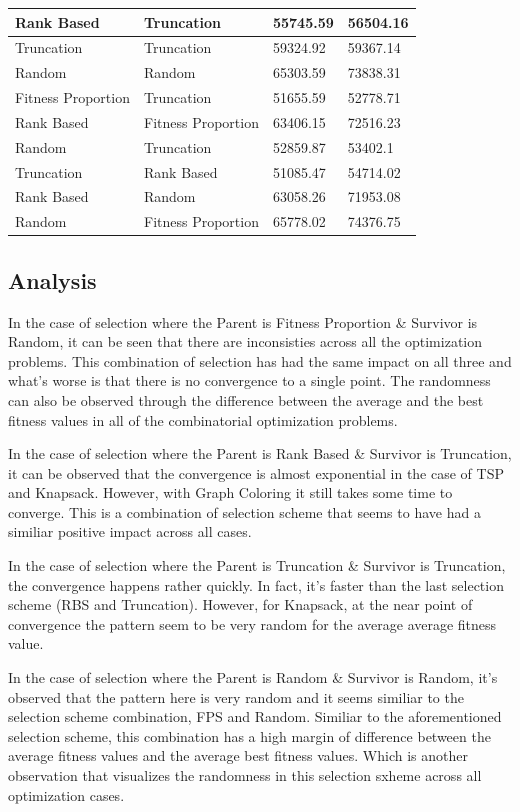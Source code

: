 \documentclass[11pt, letterpaper]{article}
\begin{document}
\begin{table}[H]
\begin{tabular}{|l|l|l|l|}
        Rank Based & Truncation & 55745.59 & 56504.16 \\ \hline
        Truncation & Truncation & 59324.92 & 59367.14 \\ \hline
        Random & Random & 65303.59 & 73838.31 \\ \hline
        Fitness Proportion & Truncation & 51655.59 & 52778.71 \\ \hline
        Rank Based & Fitness Proportion & 63406.15 & 72516.23 \\ \hline
        Random & Truncation & 52859.87 & 53402.1 \\ \hline
        Truncation & Rank Based & 51085.47 & 54714.02 \\ \hline
        Rank Based & Random & 63058.26 & 71953.08 \\ \hline
        Random & Fitness Proportion & 65778.02 & 74376.75 \\ \hline
    \end{tabular}
\end{table}

\newpage
\subsection {Analysis}
In the case of selection where the Parent is Fitness Proportion \& Survivor is Random, it can be seen that there are inconsisties across all the optimization problems. This combination of selection has had the same impact on all three and what's worse is that there is no convergence to a single point. The randomness can also be observed through the difference between the average and the best fitness values in all of the combinatorial optimization problems.

In the case of selection where the Parent is Rank Based \& Survivor is Truncation, it can be observed that the convergence is almost exponential in the case of TSP and Knapsack. However, with Graph Coloring it still takes some time to converge. This is a combination of selection scheme that seems to have had a similiar positive impact across all cases.

In the case of selection where the Parent is Truncation \& Survivor is Truncation, the convergence happens rather quickly. In fact, it's faster than the last selection scheme (RBS and Truncation). However, for Knapsack, at the near point  of convergence the pattern seem to be very random for the average average fitness value.

In the case of selection where the Parent is Random \& Survivor is Random, it's observed that the pattern here is very random and it seems similiar to the selection scheme combination, FPS and Random. Similiar to the aforementioned selection scheme, this combination has a high margin of difference between the average fitness values and the average best fitness values.  Which is another observation that visualizes the randomness in this selection sxheme across all optimization cases.
\end{document}
